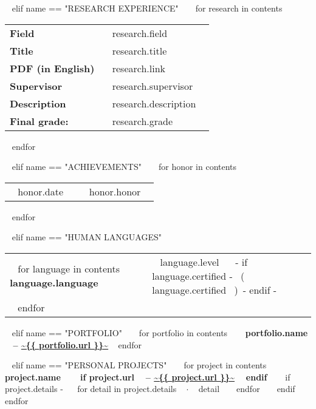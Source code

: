 \begin{minipage}{\textwidth}
~{ elif name == "RESEARCH EXPERIENCE" }~
  ~{ for research in contents }~
    \begin{tabular}{ @{} p{32mm} p{135mm} @{} }

    \small \bf Field & \small ~{{ research.field }}~ \\
    \small \bf Title & \small ~{{ research.title }}~ \\
    \small \bf PDF (in English) & \small ~{{ research.link }}~ \\
    \small \bf Supervisor & \small ~{{ research.supervisor }}~ \\
    \small \bf Description & \small ~{{ research.description }}~ \\
    \small \bf \small \color{maingrey} Final grade: & \small \color{maingrey} ~{{ research.grade }}~ \\
    
    \end{tabular}
    \vspace{1mm}
  ~{ endfor }~
  \vspace{4mm}

~{ elif name == "ACHIEVEMENTS" }~
  ~{ for honor in contents }~
    \begin{tabular}{ @{} p{32mm} p{135mm} @{} }
    {~{{ honor.date }}~} & {\small ~{{ honor.honor }}~}
    \end{tabular}
    \vspace{1mm}
  ~{ endfor }~

~{ elif name == "HUMAN LANGUAGES" }~
  \begin{tabular}{ @{} p{32mm} p{135mm} @{} }
  ~{ for language in contents }~
    \bf {~{{ language.language }}~} & {\small ~{{ language.level }}~ ~{- if language.certified -}~ \small\color{maingrey}\hspace{1mm}(~{{ language.certified }}~)~{- endif -}~} \\
  ~{ endfor }~
  \end{tabular}
  \vspace{2mm}

~{ elif name == "PORTFOLIO" }~
  ~{ for portfolio in contents }~
    {\bf ~{{ portfolio.name }}~ -- \color{maincolor}\url{~{{ portfolio.url }}~} }
    \vspace{1mm}
  ~{ endfor }~
  \vspace{5mm}

~{ elif name == "PERSONAL PROJECTS" }~
  ~{ for project in contents }~
    {\small\bf ~{{ project.name }}~ ~{ if project.url }~ -- \color{maincolor}\url{~{{ project.url }}~} ~{ endif }~ }
    \vspace{1mm}
    ~{ if project.details -}~
    ~{ for detail in project.details }~
      $\cdot$ \small ~{{ detail }}~
    ~{ endfor }~
    ~{ endif }~
    \vspace{3mm}
  ~{ endfor }~
  \vspace{15mm}


\end{minipage}
